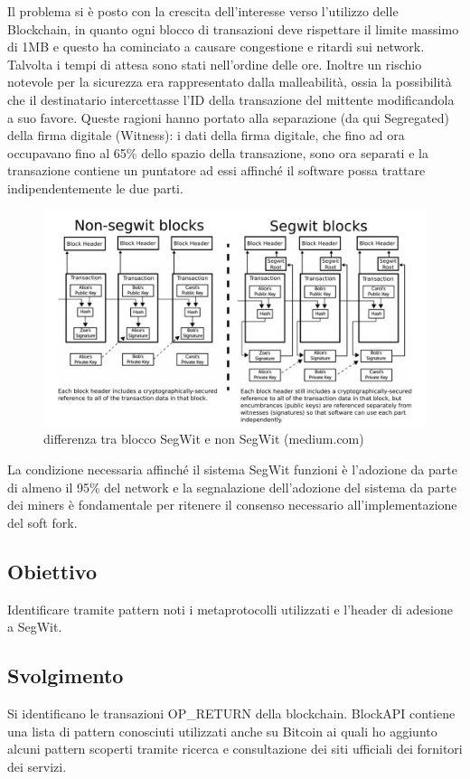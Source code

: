 Il problema si è posto con la crescita dell’interesse verso l’utilizzo delle Blockchain, in quanto ogni blocco di transazioni deve rispettare il limite massimo di 1MB e questo ha cominciato a causare congestione e ritardi sui network. Talvolta i tempi di attesa sono stati nell’ordine delle ore. Inoltre un rischio notevole per la sicurezza era rappresentato dalla malleabilità, ossia la possibilità che il destinatario intercettasse l’ID della transazione del mittente modificandola a suo favore. Queste ragioni hanno portato alla separazione (da qui Segregated) della firma digitale (Witness): i dati della firma digitale, che fino ad ora occupavano fino al 65\% dello spazio della transazione, sono ora separati e la transazione contiene un puntatore ad essi affinché il software possa trattare indipendentemente le due parti.


\begin{figure}[h]
	\centering
	\includegraphics[width=1.0\linewidth]{images/segwitvsnonsegwit-medium}
	\caption{differenza tra blocco SegWit e non SegWit (medium.com)}
	\label{fig:segwitvsnonsegwit-medium}
\end{figure}


La condizione necessaria affinché il sistema SegWit funzioni è l’adozione da parte di almeno il 95\% del network e la segnalazione dell’adozione del sistema da parte dei miners è fondamentale per ritenere il consenso necessario all’implementazione del soft fork.


\subsection{Obiettivo}
Identificare tramite pattern noti i metaprotocolli utilizzati e l’header di adesione a SegWit.
\subsection{Svolgimento}
Si identificano le transazioni OP\_RETURN della blockchain. BlockAPI contiene una lista di pattern conosciuti utilizzati anche su Bitcoin ai quali ho aggiunto alcuni pattern scoperti tramite ricerca e consultazione dei siti ufficiali dei fornitori dei servizi.

